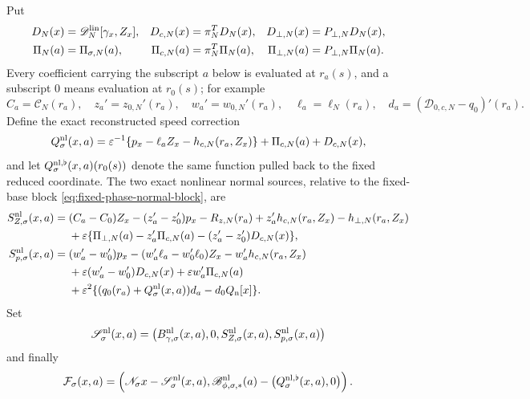 \begin{theorem}
Put
\begin{align}
 D_N(x)&=\mathscr D_N^{\rm lin}[\gamma_x,Z_x],
 &D_{c,N}(x)&=\pi_N^TD_N(x),
 &D_{\perp,N}(x)&=P_{\perp,N}D_N(x),\notag\\
 \Pi_N(a)&=\Pi_{\sigma,N}(a),
 &\Pi_{c,N}(a)&=\pi_N^T\Pi_N(a),
 &\Pi_{\perp,N}(a)&=P_{\perp,N}\Pi_N(a).
                                                        \label{eq:assembled-nonlinear-delay-pieces}
\end{align}
Every coefficient carrying the subscript \(a\) below is evaluated at
\(r_a(s)\), and a subscript \(0\) means evaluation at \(r_0(s)\); for
example
\[
 C_a=\mathcal C_N(r_a),\quad
 z_a'=z_{0,N}'(r_a),\quad
 w_a'=w_{0,N}'(r_a),\quad
 \ell_a=\ell_N(r_a),\quad
 d_a=(\mathcal D_{0,c,N}-q_0)'(r_a).
\]
Define the exact reconstructed speed correction
\begin{equation}
 Q^{\rm nl}_\sigma(x,a)
 =\varepsilon^{-1}
    \{p_x-\ell_aZ_x-h_{c,N}(r_a,Z_x)\}
       +\Pi_{c,N}(a)+D_{c,N}(x),                 \label{eq:fixed-section-nonlinear-speed}
\end{equation}
and let
\(Q^{\rm nl,\flat}_\sigma(x,a)(r_0(s))\)
denote the same function pulled back to the fixed reduced coordinate.
The two exact nonlinear normal sources, relative to the fixed-base block
\cref{eq:fixed-phase-normal-block}, are
\begin{align}
 S_{Z,\sigma}^{\rm nl}(x,a)
={}&(C_a-C_0)Z_x-(z_a'-z_0')p_x-R_{z,N}(r_a)
       +z_a'h_{c,N}(r_a,Z_x)-h_{\perp,N}(r_a,Z_x)\notag\\
 &+\varepsilon\{\Pi_{\perp,N}(a)-z_a'\Pi_{c,N}(a)
             -(z_a'-z_0')D_{c,N}(x)\},           \label{eq:fixed-section-nonlinear-Z-source}\\
 S_{p,\sigma}^{\rm nl}(x,a)
={}&(w_a'-w_0')p_x-(w_a'\ell_a-w_0'\ell_0)Z_x
       -w_a'h_{c,N}(r_a,Z_x)\notag\\
 &+\varepsilon(w_a'-w_0')D_{c,N}(x)
       +\varepsilon w_a'\Pi_{c,N}(a)\notag\\
 &+\varepsilon^2\{(q_0(r_a)+Q^{\rm nl}_\sigma(x,a))d_a
                         -d_0Q_{\rm n}[x]\}.     \label{eq:fixed-section-nonlinear-p-source}
\end{align}
Set
\begin{equation}
 \mathscr S_\sigma^{\rm nl}(x,a)
 =\bigl(B_{\gamma,\sigma}^{\rm nl}(x,a),0,
            S_{Z,\sigma}^{\rm nl}(x,a),
            S_{p,\sigma}^{\rm nl}(x,a)\bigr)     \label{eq:fixed-section-nonlinear-normal-package}
\end{equation}
and finally
\begin{equation}
 \mathcal F_\sigma(x,a)
 =\left(
   \mathscr N_\sigma x-\mathscr S_\sigma^{\rm nl}(x,a),
   \mathscr B_{\phi,\sigma,*}^{\rm nl}(a)
      -\bigl(Q^{\rm nl,\flat}_\sigma(x,a),0\bigr)
       \right).                                  \label{eq:fixed-section-nonlinear-residual}
\end{equation}


\end{theorem}
